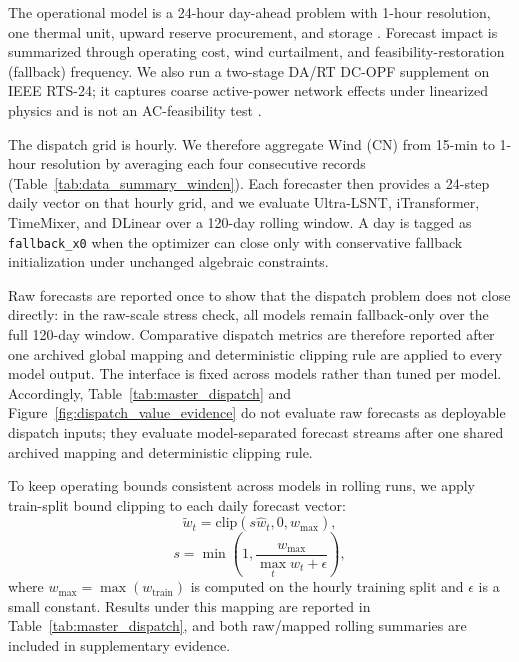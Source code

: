﻿\documentclass[review,1p,times]{elsarticle}
\begin{document}
The operational model is a 24-hour day-ahead problem with 1-hour resolution, one thermal unit, upward reserve procurement, and storage \cite{botterud2011operational,yan2025economicvalue,dlt5002_2021}. Forecast impact is summarized through operating cost, wind curtailment, and feasibility-restoration (fallback) frequency. We also run a two-stage DA/RT DC-OPF supplement on IEEE RTS-24; it captures coarse active-power network effects under linearized physics and is not an AC-feasibility test \cite{larrahondo2021acdcomp}.

The dispatch grid is hourly. We therefore aggregate Wind (CN) from 15-min to 1-hour resolution by averaging each four consecutive records (Table~\ref{tab:data_summary_windcn}). Each forecaster then provides a 24-step daily vector on that hourly grid, and we evaluate Ultra-LSNT, iTransformer, TimeMixer, and DLinear over a 120-day rolling window. A day is tagged as \texttt{fallback\_x0} when the optimizer can close only with conservative fallback initialization under unchanged algebraic constraints.

Raw forecasts are reported once to show that the dispatch problem does not close directly: in the raw-scale stress check, all models remain fallback-only over the full 120-day window. Comparative dispatch metrics are therefore reported after one archived global mapping and deterministic clipping rule are applied to every model output. The interface is fixed across models rather than tuned per model.
Accordingly, Table~\ref{tab:master_dispatch} and Figure~\ref{fig:dispatch_value_evidence} do not evaluate raw forecasts as deployable dispatch inputs; they evaluate model-separated forecast streams after one shared archived mapping and deterministic clipping rule.

To keep operating bounds consistent across models in rolling runs, we apply train-split bound clipping to each daily forecast vector:
\begin{equation}
\tilde{w}_t=\mathrm{clip}(s\hat{w}_t,0,w_{\max}),
\label{eq:dispatch_feas_map}
\end{equation}
\begin{equation}
s=\min\left(1,\frac{w_{\max}}{\max_t \hat{w}_t + \epsilon}\right),
\end{equation}
where $w_{\max}=\max(w_{\text{train}})$ is computed on the hourly training split and $\epsilon$ is a small constant. Results under this mapping are reported in Table~\ref{tab:master_dispatch}, and both raw/mapped rolling summaries are included in supplementary evidence.
\end{document}
